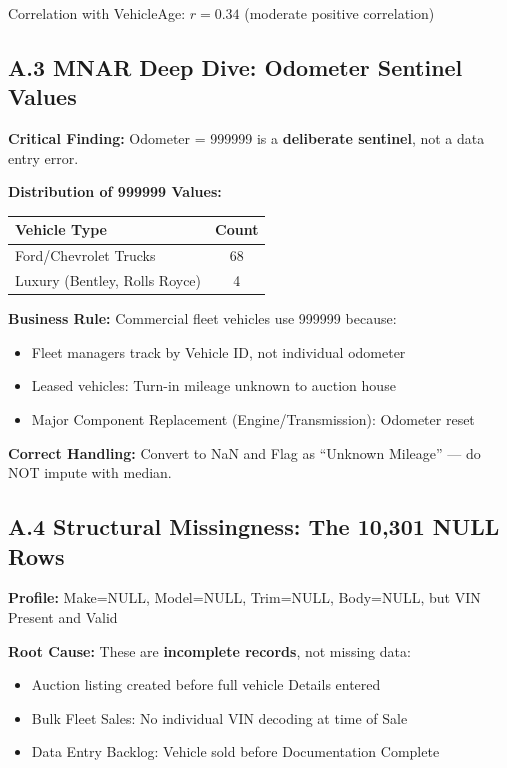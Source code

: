 \documentclass[12pt,a4paper]{article}
\begin{document}
Correlation with VehicleAge: $r = 0.34$ (moderate positive correlation)

\subsection{A.3 MNAR Deep Dive: Odometer Sentinel Values}

\textbf{Critical Finding:} Odometer = 999999 is a \textbf{deliberate sentinel}, not a data entry error.

\textbf{Distribution of 999999 Values:}
\begin{center}
\begin{tabular}{lc}
\toprule
\textbf{Vehicle Type} & \textbf{Count} \\
\midrule
Ford/Chevrolet Trucks & 68 \\
Luxury (Bentley, Rolls Royce) & 4 \\
\bottomrule
\end{tabular}
\end{center}

\textbf{Business Rule:} Commercial fleet vehicles use 999999 because:
\begin{itemize}
    \item Fleet managers track by Vehicle ID, not individual odometer
    \item Leased vehicles: Turn-in mileage unknown to auction house
    \item Major Component Replacement (Engine/Transmission): Odometer reset
\end{itemize}

\textbf{Correct Handling:} Convert to NaN and Flag as ``Unknown Mileage'' — do NOT impute with median.

\subsection{A.4 Structural Missingness: The 10,301 NULL Rows}

\textbf{Profile:} Make=NULL, Model=NULL, Trim=NULL, Body=NULL, but VIN Present and Valid

\textbf{Root Cause:} These are \textbf{incomplete records}, not missing data:
\begin{itemize}
    \item Auction listing created before full vehicle Details entered
    \item Bulk Fleet Sales: No individual VIN decoding at time of Sale
    \item Data Entry Backlog: Vehicle sold before Documentation Complete
\end{itemize}
\end{document}
